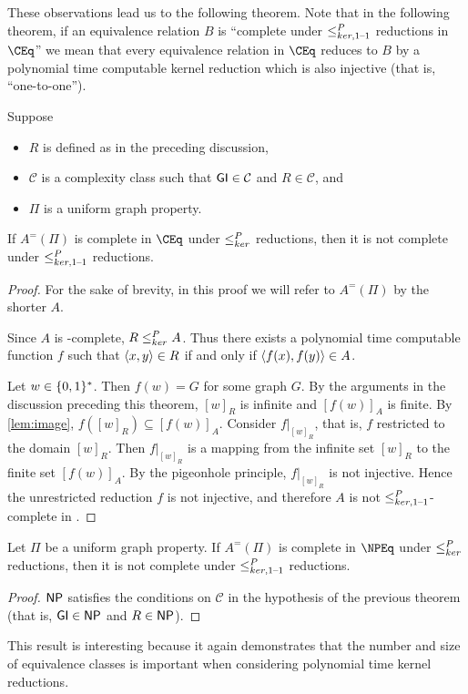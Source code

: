 These observations lead us to the following theorem.
Note that in the following theorem, if an equivalence relation $B$ is ``complete under $\leq^{P}_{ker,1\text{--}1}$ reductions in $\CEq$'' we mean that every equivalence relation in $\CEq$ reduces to $B$ by a polynomial time computable kernel reduction which is also injective (that is, ``one-to-one'').

\begin{theorem}
  Suppose
  \begin{itemize}
  \item $R$ is defined as in the preceding discussion,
  \item $\mathcal{C}$ is a complexity class such that ${\mathsf{GI}}\in\mathcal{C}$ and $R\in\mathcal{C}$, and
  \item $\Pi$ is a uniform graph property.
  \end{itemize}
  If $A^=(\Pi)$ is complete in $\CEq$ under $\leq^{P}_{ker}$ reductions, then it is not complete under $\leq^{P}_{ker,1\text{--}1}$ reductions.
\end{theorem}
\begin{proof}
  For the sake of brevity, in this proof we will refer to $A^=(\Pi)$ by the shorter $A$.

  Since $A$ is \CEq-complete, $R\leq^{P}_{ker} A$.
  Thus there exists a polynomial time computable function $f$ such that $\langle x,y\rangle\in R$ if and only if $\langle f(x),f(y)\rangle\in A$.

  Let $w\in\{0, 1\}^{*}$.
  Then $f(w)=G$ for some graph $G$.
  By the arguments in the discussion preceding this theorem, $[w]_R$ is infinite and $[f(w)]_A$ is finite.
  By \autoref{lem:image}, $f([w]_R)\subseteq [f(w)]_A$.
  Consider $f|_{[w]_R}$, that is, $f$ restricted to the domain $[w]_R$.
  Then $f|_{[w]_R}$ is a mapping from the infinite set $[w]_R$ to the finite set $[f(w)]_A$.
  By the pigeonhole principle, $f|_{[w]_R}$ is not injective.
  Hence the unrestricted reduction $f$ is not injective, and therefore $A$ is not $\leq^{P}_{ker,1\text{--}1}$-complete in \CEq.
\end{proof}

\begin{corollary}
  Let $\Pi$ be a uniform graph property.
  If $A^=(\Pi)$ is complete in $\NPEq$ under $\leq^{P}_{ker}$ reductions, then it is not complete under $\leq^{P}_{ker,1\text{--}1}$ reductions.
\end{corollary}
\begin{proof}
  ${\mathsf{NP}}$ satisfies the conditions on $\mathcal{C}$ in the hypothesis of the previous theorem (that is, ${\mathsf{GI}}\in{\ensuremath{\mathsf{NP}}}$ and $R\in{\ensuremath{\mathsf{NP}}}$).
\end{proof}

This result is interesting because it again demonstrates that the number and size of equivalence classes is important when considering polynomial time kernel reductions.

